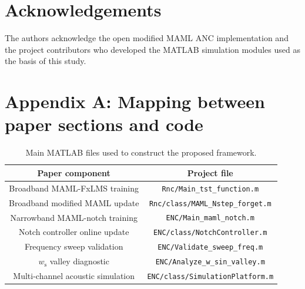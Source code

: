 \documentclass{internoise2026}
\begin{document}
\section*{Acknowledgements}

The authors acknowledge the open modified MAML ANC implementation and the project contributors who developed the MATLAB simulation modules used as the basis of this study.




\section*{Appendix A: Mapping between paper sections and code}

\begin{table}[htbp!]
\caption{Main MATLAB files used to construct the proposed framework.}
\label{tab:code_mapping}
\centering
\begin{tabular}{c c}
\hline
\textbf{Paper component} & \textbf{Project file} \\
\hline
Broadband MAML-FxLMS training & \texttt{Rnc/Main\_tst\_function.m} \\
Broadband modified MAML update & \texttt{Rnc/class/MAML\_Nstep\_forget.m} \\
Narrowband MAML-notch training & \texttt{ENC/Main\_maml\_notch.m} \\
Notch controller online update & \texttt{ENC/class/NotchController.m} \\
Frequency sweep validation & \texttt{ENC/Validate\_sweep\_freq.m} \\
$w_{\mathrm{s}}$ valley diagnostic & \texttt{ENC/Analyze\_w\_sin\_valley.m} \\
Multi-channel acoustic simulation & \texttt{ENC/class/SimulationPlatform.m} \\
\hline
\end{tabular}
\end{table}
\end{document}
